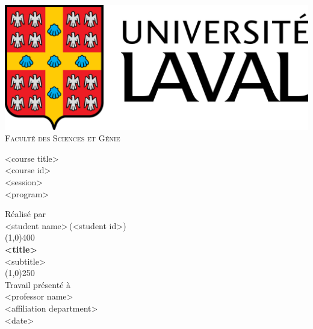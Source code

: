 

\newcommand{\coursetitle}{<course title>}
\newcommand{\courseid}{<course id>}
\newcommand{\session}{<session>}
\newcommand{\program}{<program>}
\newcommand{\studentname}{<student name>}
\newcommand{\studentid}{<student id>}
\newcommand{\titlename}{<title>}
\newcommand{\subtitlename}{<subtitle>}
\newcommand{\professorname}{<professor name>}
\newcommand{\affiliationdep}{<affiliation department>}
\newcommand{\duedate}{<date>}


\begin{titlepage}

  \begin{minipage}{.45\linewidth}
    \begin{flushleft}
      \includegraphics[scale=0.12]{./figures/ULaval} \\
      \textsc{Faculté des Sciences et Génie} \\
    \end{flushleft}
  \end{minipage}
  \hfill
  \begin{minipage}{.45\linewidth}
    \begin{flushright}
      \coursetitle \\
      \courseid \\
      \session \\
      \program \\
    \end{flushright}
  \end{minipage}

  \begin{center}
    \vspace{30mm}
    Réalisé par \\
    \studentname\,(\studentid) \\
    \vspace{35mm}
    \line(1,0){400} \\
    \vspace{2mm}
    \textbf{\titlename} \\
    \subtitlename \\
    \line(1,0){250} \\
    \vspace{35mm}
    Travail présenté à \\
    \professorname \\
    \affiliationdep \\
    \vspace{35mm}
    \duedate
  \end{center}

\end{titlepage}


\fancyhead[L]{}
\fancyhead[R]{}
\fancyhead[C]{}
\fancyfoot[C]{\thepage}
